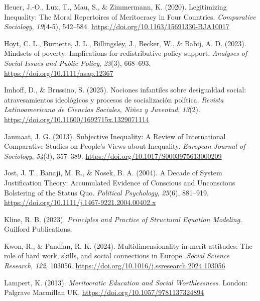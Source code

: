 \documentclass[
  13pt,
]{article}
\newlength{\cslhangindent}
\newenvironment{CSLReferences}[2] %
 {\begin{list}{}{%
  \setlength{\itemindent}{0pt}
  \setlength{\leftmargin}{0pt}
  \setlength{\parsep}{0pt}
  \ifodd #1
   \setlength{\leftmargin}{\cslhangindent}
   \setlength{\itemindent}{-1\cslhangindent}
  \fi
  \setlength{\itemsep}{#2\baselineskip}}}
 {\end{list}}
\begin{document}
\begin{CSLReferences}{1}{0}
Heuer, J.-O., Lux, T., Mau, S., \& Zimmermann, K. (2020). Legitimizing
{Inequality}: {The Moral Repertoires} of {Meritocracy} in {Four
Countries}. \emph{Comparative Sociology}, \emph{19}(4-5), 542--584.
\url{https://doi.org/10.1163/15691330-BJA10017}

Hoyt, C. L., Burnette, J. L., Billingsley, J., Becker, W., \& Babij, A.
D. (2023). Mindsets of poverty: {Implications} for redistributive policy
support. \emph{Analyses of Social Issues and Public Policy},
\emph{23}(3), 668--693. \url{https://doi.org/10.1111/asap.12367}

Imhoff, D., \& Brussino, S. (2025). {Nociones infantiles sobre
desigualdad social: atravesamientos ideológicos y procesos de
socialización política}. \emph{Revista Latinoamericana de Ciencias
Sociales, Niñez y Juventud}, \emph{13}(2).
\url{https://doi.org/10.11600/1692715x.1329071114}

Janmaat, J. G. (2013). Subjective {Inequality}: A {Review} of
{International Comparative Studies} on {People}'s {Views} about
{Inequality}. \emph{European Journal of Sociology}, \emph{54}(3),
357--389. \url{https://doi.org/10.1017/S0003975613000209}

Jost, J. T., Banaji, M. R., \& Nosek, B. A. (2004). A {Decade} of
{System Justification Theory}: {Accumulated Evidence} of {Conscious} and
{Unconscious Bolstering} of the {Status Quo}. \emph{Political
Psychology}, \emph{25}(6), 881--919.
\url{https://doi.org/10.1111/j.1467-9221.2004.00402.x}

Kline, R. B. (2023). \emph{Principles and {Practice} of {Structural
Equation Modeling}}. Guilford Publications.

Kwon, R., \& Pandian, R. K. (2024). Multidimensionality in merit
attitudes: {The} role of hard work, skills, and social connections in
{Europe}. \emph{Social Science Research}, \emph{122}, 103056.
\url{https://doi.org/10.1016/j.ssresearch.2024.103056}

Lampert, K. (2013). \emph{Meritocratic {Education} and {Social
Worthlessness}}. London: Palgrave Macmillan UK.
\url{https://doi.org/10.1057/9781137324894}


\end{CSLReferences}
\end{document}
